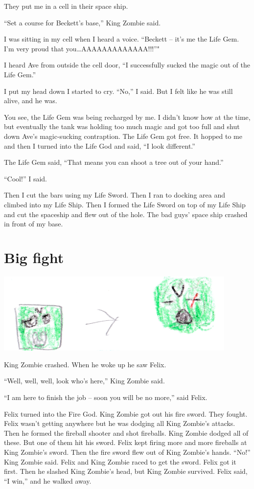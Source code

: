 \documentclass[booklet, twoside, 12pt]{krantz}
\begin{document}
They put me in a cell in their space ship.

``Set a course for Beckett's base,'' King Zombie said.

I was sitting in my cell when I heard a voice. ``Beckett -- it's me the
Life Gem. I'm very proud that you\ldots{}AAAAAAAAAAAAA!!!''"

I heard Ave from outside the cell door, ``I successfully sucked the
magic out of the Life Gem.''

I put my head down I started to cry. ``No,'' I said. But I felt like he
was still alive, and he was.

You see, the Life Gem was being recharged by me. I didn't know how at
the time, but eventually the tank was holding too much magic and got too
full and shut down Ave's magic-sucking contraption. The Life Gem got
free. It hopped to me and then I turned into the Life God and said, ``I
look different.''

The Life Gem said, ``That means you can shoot a tree out of your hand.''

``Cool!'' I said.

Then I cut the bars using my Life Sword. Then I ran to docking area and
climbed into my Life Ship. Then I formed the Life Sword on top of my
Life Ship and cut the spaceship and flew out of the hole. The bad guys'
space ship crashed in front of my base.

\hypertarget{big-fight}{%
\section{Big fight}\label{big-fight}}

\includegraphics[width=4.6875in,height=\textheight]{img/four-bad-guys/greenheads.jpg}

King Zombie crashed. When he woke up he saw Felix.

``Well, well, well, look who's here,'' King Zombie said.

``I am here to finish the job -- soon you will be no more,'' said Felix.

Felix turned into the Fire God. King Zombie got out his fire sword. They
fought. Felix wasn't getting anywhere but he was dodging all King
Zombie's attacks. Then he formed the fireball shooter and shot
fireballs. King Zombie dodged all of these. But one of them hit his
sword. Felix kept firing more and more fireballs at King Zombie's sword.
Then the fire sword flew out of King Zombie's hands. ``No!'' King Zombie
said. Felix and King Zombie raced to get the sword. Felix got it first.
Then he slashed King Zombie's head, but King Zombie survived. Felix
said, ``I win,'' and he walked away.
\end{document}

